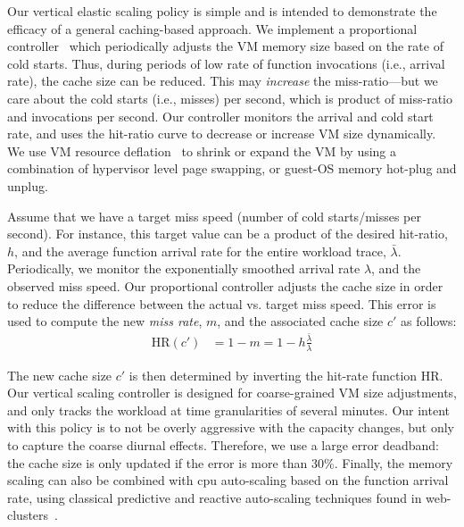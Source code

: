 Our vertical elastic scaling policy is simple and is intended to demonstrate the efficacy of a general caching-based approach. 
We implement a  proportional controller~\cite{pid-wiki} which periodically adjusts the VM memory size based on the rate of cold starts.  
Thus, during periods of low rate of function invocations (i.e., arrival rate), the cache size can be reduced. 
This may \emph{increase} the miss-ratio---but we care about the cold starts (i.e., misses) per second, which is product of miss-ratio and invocations per second.
Our controller monitors the arrival and cold start rate, and uses the hit-ratio curve to decrease or increase VM size dynamically. 
We use VM resource deflation~\cite{deflation-eurosys19} to shrink or expand the VM by using a combination of hypervisor level page swapping, or guest-OS memory hot-plug and unplug. 


Assume that we have a target miss speed (number of cold starts/misses per second).
For instance, this target value can be a product of the desired hit-ratio, $h$, and the average function arrival rate for the entire workload trace, $\bar{\lambda}$. 
Periodically, we monitor the exponentially smoothed arrival rate $\lambda$, and the observed miss speed.
Our proportional controller adjusts the cache size in order to reduce the difference between the actual vs. target miss speed.
This error is used to compute the new \emph{miss rate}, $m$, and the associated cache size $c'$ as follows:
\begin{align}
  \label{eq:dyn}
  \text{HR}(c') & = 1-m = 1 - h\frac{\bar{\lambda}}{\lambda}
\end{align}

\noindent The new cache size $c'$ is then determined by inverting the hit-rate function $\text{HR}$.
Our vertical scaling controller is designed for coarse-grained VM size adjustments, and only tracks the workload at time granularities of several minutes. 
Our intent with this policy is to not be overly aggressive with the capacity changes, but only to capture the coarse diurnal effects. 
Therefore, we use a large error deadband: the cache size is only updated if the error is more than 30\%. 
Finally, the memory scaling can also be combined with cpu auto-scaling based on the function arrival rate, using classical predictive and reactive auto-scaling techniques found in web-clusters~\cite{gandhi2012autoscale}. 

